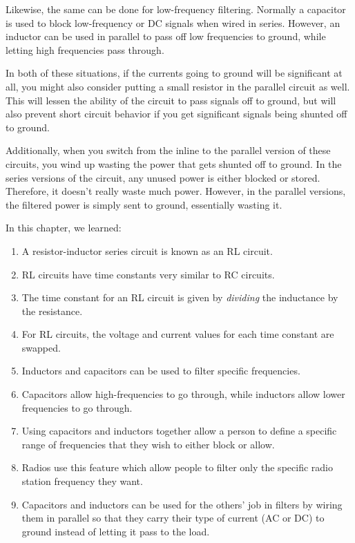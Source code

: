Likewise, the same can be done for low-frequency filtering.
Normally a capacitor is used to block low-frequency or DC signals when wired in series.
However, an inductor can be used in parallel to pass off low frequencies to ground, while letting high frequencies pass through.

In both of these situations, if the currents going to ground will be significant at all, you might also consider putting a small resistor in the parallel circuit as well. 
This will lessen the ability of the circuit to pass signals off to ground, but will also prevent short circuit behavior if you get significant signals being shunted off to ground.

Additionally, when you switch from the inline to the parallel version of these circuits, you wind up wasting the power that gets shunted off to ground.
In the series versions of the circuit, any unused power is either blocked or stored.
Therefore, it doesn't really waste much power.
However, in the parallel versions, the filtered power is simply sent to ground, essentially wasting it.

\reviewsection

In this chapter, we learned:

\begin{enumerate}
\item A resistor-inductor series circuit is known as an RL circuit.
\item RL circuits have time constants very similar to RC circuits.
\item The time constant for an RL circuit is given by \emph{dividing} the inductance by the resistance.
\item For RL circuits, the voltage and current values for each time constant are swapped.
\item Inductors and capacitors can be used to filter specific frequencies.
\item Capacitors allow high-frequencies to go through, while inductors allow lower frequencies to go through.
\item Using capacitors and inductors together allow a person to define a specific range of frequencies that they wish to either block or allow.
\item Radios use this feature which allow people to filter only the specific radio station frequency they want.
\item Capacitors and inductors can be used for the others' job in filters by wiring them in parallel so that they carry their type of current (AC or DC) to ground instead of letting it pass to the load.
\end{enumerate}

\applysection


